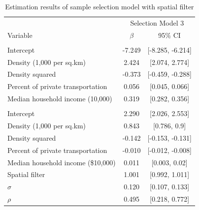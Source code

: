 \documentclass[]{elsarticle} %
\begin{document}
\begin{table}[!h]

\caption{\label{tab:tabulate-sample-selection3-results}\label{tab:selection3-results}Estimation results of sample selection model with spatial filter}
\centering
\fontsize{8}{10}\selectfont
\begin{tabular}[t]{lcc}
\toprule
\multicolumn{1}{c}{ } & \multicolumn{2}{c}{Selection Model 3} \\
\cmidrule(l{3pt}r{3pt}){2-3}
Variable & $\beta$ & 95\% CI\\
\midrule
\addlinespace[0.3em]
\multicolumn{3}{l}{\textbf{Sample Selection Model}}\\
\hspace{1em}Intercept & -7.249 & {}[-8.285, -6.214]\\
\hspace{1em}Density (1,000 per sq.km) & 2.424 & {}[2.074, 2.774]\\
\hspace{1em}Density squared & -0.373 & {}[-0.459, -0.288]\\
\hspace{1em}Percent of private transportation & 0.056 & {}[0.045, 0.066]\\
\hspace{1em}Median household income (10,000) & 0.319 & {}[0.282, 0.356]\\
\addlinespace[0.3em]
\multicolumn{3}{l}{\textbf{Outcome Model}}\\
\hspace{1em}Intercept & 2.290 & {}[2.026, 2.553]\\
\hspace{1em}Density (1,000 per sq.km) & 0.843 & {}[0.786, 0.9]\\
\hspace{1em}Density squared & -0.142 & {}[-0.153, -0.131]\\
\hspace{1em}Percent of private transportation & -0.010 & {}[-0.012, -0.008]\\
\hspace{1em}Median household income (\$10,000) & 0.011 & {}[0.003, 0.02]\\
\hspace{1em}Spatial filter & 1.001 & {}[0.992, 1.011]\\
$\sigma$ & 0.120 & {}[0.107, 0.133]\\
$\rho$ & 0.495 & {}[0.218, 0.772]\\
\bottomrule
\end{tabular}
\end{table}
\end{document}

